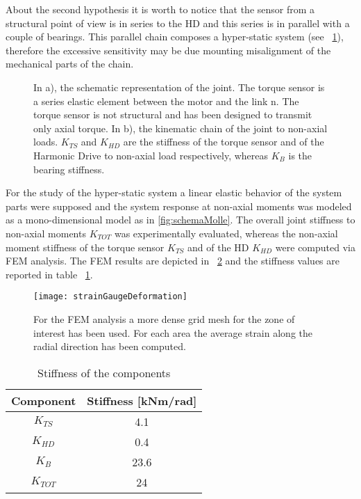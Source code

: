 About the second hypothesis it is worth to notice that the sensor from a structural point of view is in series to the HD and this series is in parallel with a couple of bearings. This parallel chain composes a hyper-static system (see \figurename \ \ref{fig:schemaGiuntoEMolle}), therefore the excessive sensitivity may be due mounting misalignment of the mechanical parts of the chain. 
%
\begin{figure}[]
	\centering
	\caption{In a), the schematic representation of the joint. The torque sensor is a series elastic element between the motor and the link n. The torque sensor is not structural and has been designed to transmit only axial torque. In b), the kinematic chain of the joint to non-axial loads. $K_{TS}$ and $K_{HD}$ are the stiffness of the torque sensor and of the Harmonic Drive to non-axial load respectively, whereas $K_B$ is the bearing stiffness.}
	\label{fig:schemaGiuntoEMolle}
\end{figure}
%
\par For the study of the hyper-static system a linear  elastic behavior of the system parts were supposed and the system response at non-axial moments was modeled as a mono-dimensional model as in \figurename \ref{fig:schemaMolle}.
The overall joint stiffness to non-axial moments $K_{TOT}$ was experimentally evaluated, whereas the non-axial moment stiffness of the torque sensor $K_{TS}$ and of the HD $K_{HD}$ were computed via FEM analysis. The FEM results are depicted in \figurename \ \ref{fig:strainGaugeDeformation} and the stiffness values are reported in table \tablename \ \ref{tab:nonAxialStiffness}.
%
\begin{figure}[]
	\centering
	\texttt{[image: strainGaugeDeformation]} 
	\caption{For the FEM analysis a more dense grid mesh for the zone of interest has been used. For each area the average strain along the radial direction has been computed.}
	\label{fig:strainGaugeDeformation}
\end{figure}
%
\begin{table}[]
	\renewcommand{\arraystretch}{1.3}
	\caption{Stiffness of the components}
	\label{tab:nonAxialStiffness}
	\centering
	\begin{tabular}{c c}
		\hline \hline
		\bfseries Component & \bfseries Stiffness [kNm/rad]\\
		\hline
		$K_{TS}$  & 4.1\\
		$K_{HD}$  & 0.4\\
		$K_{B}$   & 23.6\\
		\hline
		$K_{TOT}$   & 24\\
		\hline \hline
	\end{tabular}
\end{table}
